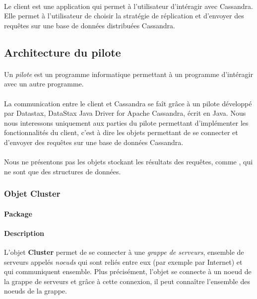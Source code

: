 \documentclass[12pt]{article}
\begin{document}
\paragraph{} Le client est une application qui permet à l'utilisateur d'intéragir avec Cassandra. 
Elle permet à l'utilisateur de choisir la stratégie de réplication et d'envoyer des requêtes sur une base de données distribuées Cassandra.


\subsection{Architecture du pilote}

\paragraph{} Un \textit{pilote} est un programme informatique permettant à un programme d'intéragir avec un autre programme.

\paragraph{} La communication entre le client et Cassandra se faît grâce à un pilote développé par Datastax, DataStax Java Driver for Apache Cassandra, écrit en Java.
Nous nous interessons uniquement aux parties du pilote permettant d'implémenter les fonctionnalités du client, c'est à dire les objets permettant de se connecter et d'envoyer des requêtes sur une base de données Cassandra.

\paragraph{} Nous ne présentons pas les objets stockant les résultats des requêtes, comme , qui ne sont que des structures de données. 

\subsubsection{Objet Cluster}

\paragraph{Package}  

\paragraph{Description} L'objet \textbf{Cluster} permet de se connecter à une \textit{grappe de serveurs}, ensemble de serveurs appelés \textit{noeuds} qui sont reliés entre eux (par exemple par Internet) et qui communiquent ensemble.
Plus précisément, l'objet se connecte à un noeud de la grappe de serveurs et grâce à cette connexion, il peut connaître l'ensemble des noeuds de la grappe.
\end{document}
